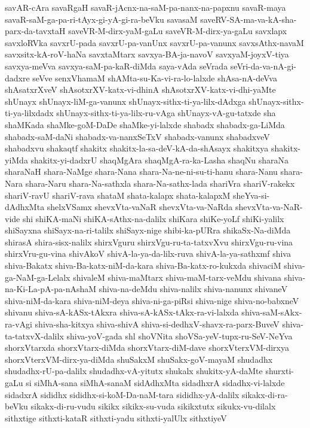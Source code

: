 {savAR-cAra
savaRgaH
savaR-jAcnx-na-saM-pa-nanx-na-papxnu
savaR-maya
savaR-saM-ga-pa-ri-tAyx-gi-yA-gi-ra-beVku
savasaM
saveRV-SA-ma-va-kA-sha-parx-da-tavxtaH
saveVR-M-dirx-yaM-gaLu
saveVR-M-dirx-ya-gaLu
savxlapx
savxloRVka
savxrU-pada
savxrU-pa-vanUnx
savxrU-pa-vanunx
savxsAthx-navaM
savxsitx-kA-roV-haNa
savxtaMtarx
savxya-BA-ja-navoV
savxyaM-joyxV-tiya
savxya-meVva
savxya-saM-pa-kaR-diMda
saya-vAda
seVrada
seVri-da-va-nA-gi-dadxre
seVve
senxVhamaM
shAMta-su-Ka-vi-ra-lo-lalxde
shAsa-nA-deVva
shAsatxrXveV
shAsotxrXV-katx-vi-dhinA
shAsotxrXV-katx-vi-dhi-yaMte
shUnayx
shUnayx-liM-ga-vanunx
shUnayx-sithx-ti-ya-lilx-dAdxga
shUnayx-sithx-ti-ya-lilxdadx
shUnayx-sithx-ti-ya-lilx-ru-vAga
shUnayx-vA-gu-tatxde
sha
shaMKada
shaMke-goM-DaDe
shaMke-yi-lalxde
shabadx
shabadx-ga-LiMda
shabadx-saM-daNi
shabadx-va-nanxSeTxV
shabadx-vanunx
shabadxveV
shabadxvu
shakaqtf
shakitx
shakitx-la-sa-deV-kA-da-shAsayx
shakitxya
shakitx-yiMda
shakitx-yi-dadxrU
shaqMgAra
shaqMgA-ra-ka-Lasha
shaqNu
sharaNa
sharaNaH
shara-NaMge
shara-Nana
shara-Na-ne-ni-su-ti-hanu
shara-Nanu
shara-Nara
shara-Naru
shara-Na-sathxla
shara-Na-sathx-lada
shariVra
shariV-rakekx
shariV-ravU
shariV-rava
shataM
shata-kalapx
shata-kalapxM
sheYva-si-dAdhxMta
shelxVSamx
shevxVta-vaNaR
shevxVta-va-NaRda
shevxVta-va-NaR-vide
shi
shiKA-maNi
shiKA-sAthx-na-dalilx
shiKara
shiKe-yoLf
shiKi-yalilx
shiSayxna
shiSayx-na-ri-talilx
shiSayx-nige
shibi-ka-pURra
shikaSx-Na-diMda
shirasA
shira-sisx-nalilx
shirxVguru
shirxVgu-ru-ta-tatxvXvu
shirxVgu-ru-vina
shirxVru-gu-vina
shivAkoV
shivA-la-ya-da-lilx-ruva
shivA-la-ya-sathxmf
shiva
shiva-Bakatx
shiva-Ba-katx-niM-da-kara
shiva-Ba-katx-ro-kukxda
shivaciM
shiva-ga-NaM-ga-Lelalx
shivaleM
shiva-maMtarx
shiva-maM-tarx-veMdu
shivana
shiva-na-Ki-La-pA-pa-nAshaM
shiva-na-deMdu
shiva-nalilx
shiva-nanunx
shivaneV
shiva-niM-da-kara
shiva-niM-deya
shiva-ni-ga-piRsi
shiva-nige
shiva-no-babxneV
shivanu
shiva-sA-kASx-tAkxra
shiva-sA-kASx-tAkx-ra-vi-lalxda
shiva-saM-sAkx-ra-vAgi
shiva-sha-kitxya
shiva-shivA
shiva-si-dedhxV-shavx-ra-parx-BuveV
shiva-ta-tatxvX-dalilx
shiva-yoV-gada
shl
shoVNita
shoVSa-yeV-tupx-ru-SeV-NeYva
shorxVtarxda
shorxVtarx-diMda
shorxVtarx-diM-dave
shorxVterxVM-dirxya
shorxVterxVM-dirx-ya-diMda
shuSakxM
shuSakx-goV-mayaM
shudadhx
shudadhx-rU-pa-dalilx
shudadhx-vA-yitutx
shukalx
shukitx-yA-daMte
shurxti-gaLu
si
siMhA-sana
siMhA-sanaM
sidAdhxMta
sidadhxrA
sidadhx-vi-lalxde
sidadxrA
sididhx
sididhx-si-koM-Da-naM-tara
sididhx-yA-dalilx
sikakx-di-ra-beVku
sikakx-di-ru-vudu
sikikx
sikikx-su-vuda
sikikxtutx
sikukx-vu-dilalx
sithxtige
sithxti-kataR
sithxti-yadu
sithxti-yalUlx
sithxtiyeV
}
